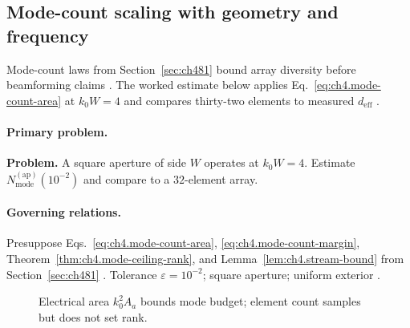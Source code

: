 ﻿\subsection{Mode-count scaling with geometry and frequency}
\label{sec:ch4104}

Mode-count laws from Section~\ref{sec:ch481} bound array diversity before beamforming claims \cite{collin2001,jackson1999,hansen1988,harrington2001,stratton1941,devaney2004}.
The worked estimate below applies Eq.~\eqref{eq:ch4.mode-count-area} at \(k_{0}W=4\) and compares thirty-two elements to measured \(d_{\mathrm{eff}}\)
\cite{harrington2001,devaney2004,hansen1988}.

\paragraph{Primary problem.}
\textbf{Problem.} A square aperture of side \(W\) operates at \(k_{0}W=4\). Estimate \(N_{\mathrm{mode}}^{\mathrm{(ap)}}(10^{-2})\) and compare to a \(32\)-element array.

\paragraph{Governing relations.}
Presuppose Eqs.~\eqref{eq:ch4.mode-count-area}, \eqref{eq:ch4.mode-count-margin}, Theorem~\ref{thm:ch4.mode-ceiling-rank}, and Lemma~\ref{lem:ch4.stream-bound}
from Section~\ref{sec:ch481} \cite{collin2001,jackson1999,hansen1988,harrington2001,stratton1941,devaney2004}. Tolerance \(\varepsilon=10^{-2}\); square aperture;
uniform exterior \cite{stratton1941,hansen1988}.

\begin{figure}[t]
\centering
{}
\caption{Electrical area \(k_{0}^{2}A_{a}\) bounds mode budget; element count samples but does not set rank.}
\label{fig:ch4.ex-mode-count-scaling}
\end{figure}


